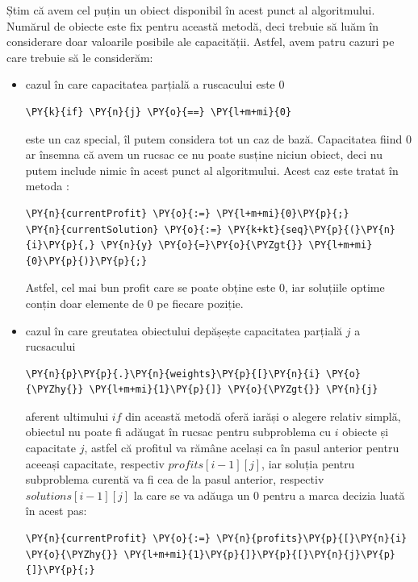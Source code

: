 \begin{sloppypar}
    Știm că avem cel puțin un obiect disponibil în acest punct al algoritmului. Numărul de obiecte este fix pentru această metodă, deci trebuie să luăm în considerare doar valoarile posibile ale capacității. Astfel, avem patru cazuri pe care trebuie să le considerăm:
    \begin{itemize}
        \item cazul în care capacitatea parțială a ruscacului este 0
        \begin{Verbatim}[commandchars=\\\{\}]
                        \PY{k}{if} \PY{n}{j} \PY{o}{==} \PY{l+m+mi}{0}
\end{Verbatim}
        este un caz special, îl putem considera tot un caz de bază. Capacitatea fiind 0 ar însemna că avem un rucsac ce nu poate susține niciun obiect, deci nu putem include nimic în acest punct al algoritmului. Acest caz este tratat în metoda :
        \begin{Verbatim}[commandchars=\\\{\}]
\PY{n}{currentProfit} \PY{o}{:=} \PY{l+m+mi}{0}\PY{p}{;}
\PY{n}{currentSolution} \PY{o}{:=} \PY{k+kt}{seq}\PY{p}{(}\PY{n}{i}\PY{p}{,} \PY{n}{y} \PY{o}{=}\PY{o}{\PYZgt{}} \PY{l+m+mi}{0}\PY{p}{)}\PY{p}{;}
\end{Verbatim}
        Astfel, cel mai bun profit care se poate obține este 0, iar soluțiile optime conțin doar elemente de 0 pe fiecare poziție.
        \item cazul în care greutatea obiectului depășește capacitatea parțială $j$ a rucsacului
        \begin{Verbatim}[commandchars=\\\{\}]
                    \PY{n}{p}\PY{p}{.}\PY{n}{weights}\PY{p}{[}\PY{n}{i} \PY{o}{\PYZhy{}} \PY{l+m+mi}{1}\PY{p}{]} \PY{o}{\PYZgt{}} \PY{n}{j}
\end{Verbatim}
        aferent ultimului $if$ din această metodă oferă iarăși o alegere relativ simplă, obiectul nu poate fi adăugat în rucsac pentru subproblema cu $i$ obiecte și capacitate $j$, astfel că profitul va rămâne același ca în pasul anterior pentru aceeași capacitate, respectiv $profits[i - 1][j]$, iar soluția pentru subproblema curentă va fi cea de la pasul anterior, respectiv $solutions[i - 1][j]$ la care se va adăuga un 0 pentru a marca decizia luată în acest pas:
        \begin{Verbatim}[commandchars=\\\{\}]
\PY{n}{currentProfit} \PY{o}{:=} \PY{n}{profits}\PY{p}{[}\PY{n}{i} \PY{o}{\PYZhy{}} \PY{l+m+mi}{1}\PY{p}{]}\PY{p}{[}\PY{n}{j}\PY{p}{]}\PY{p}{;}

\end{Verbatim}
\end{itemize}
\end{sloppypar}
